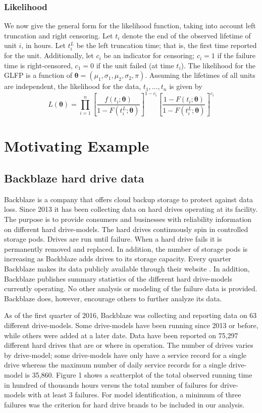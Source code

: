 \documentclass[aap]{imsart}
\begin{document}
\subsubsection{Likelihood}
We now give the general form for the likelihood function, taking into account left truncation and right censoring.  Let $t_{i}$ denote the end of the observed lifetime of unit $i$, in hours.  Let $t_i^L$ be the left truncation time; that is, the first time reported for the unit.  Additionally, let $c_i$ be an indicator for censoring; $c_i=1$ if the failure time is right-censored, $c_1=0$ if the unit failed (at time $t_i$). The likelihood for the GLFP is a function of $\bm{\theta} = (\mu_1, \sigma_1, \mu_2, \sigma_2, \pi)$.  Assuming the lifetimes of all units are independent, the likelihood for the data, $t_1,\ldots,t_n$ is given by
\begin{equation*}
L(\bm{\theta})= \prod_{i=1}^{n} \left[\frac{f(t_i;\bm{\theta})}{1-F(t_i^L;\bm{\theta})}\right]^{1-c_i} \left[ \frac{1-F(t_i;\bm{\theta})}{1-F(t_i^L;\bm{\theta})} \right]^{c_i}
\end{equation*}

\section{Motivating Example}
\label{sec:Data}
\subsection{Backblaze hard drive data}
Backblaze is a company that offers cloud backup storage to protect against data loss.  Since 2013 it has been collecting data on hard drives operating at its facility.  The purpose is to provide consumers and businesses with reliability information on different hard drive-models.  The hard drives continuously spin in controlled storage pods.  Drives are run until failure.  When a hard drive fails it is permanently removed and replaced.  In addition, the number of storage pods is increasing as Backblaze adds drives to its storage capacity.  Every quarter Backblaze makes its data publicly available through their website \citep{backblaze}. In addition, Backblaze publishes summary statistics of the different hard drive-models currently operating.  No other analysis or modeling of the failure data is provided.  Backblaze does, however, encourage others to further analyze its data. 

As of the first quarter of 2016, Backblaze was collecting and reporting data on 63 different drive-models.  Some drive-models have been running since 2013 or before, while others were added at a later date.  Data have been reported on 75,297 different hard drives that are or where in operation.  The number of drives varies by drive-model; some drive-models have only have a service record for a single drive whereas the maximum number of daily service records for a single drive-model is 35,860.  Figure 1 shows a scatterplot of the total observed running time in hundred of thousands hours versus the total number of failures for drive-models with at least 3 failures.  For model identification, a minimum of three failures was the criterion for hard drive brands to be included in our analysis.  
\end{document}
